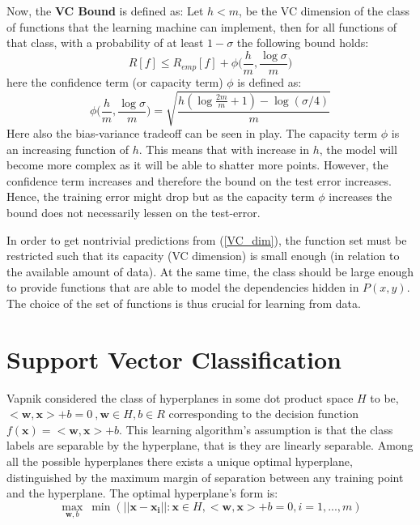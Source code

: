 \documentclass{article}
\begin{document}
Now, the \textbf{VC Bound} is defined as: Let $h < m$, be the VC dimension of the class of functions that the learning machine can implement, then for all functions of that class, with a probability of at least $1-\sigma$ the following bound holds:
\begin{equation}
\label{VC_dim}
R[f] \leq R_{emp}[f] + \phi \Big(\frac{h}{m} , \frac{\log{\sigma}}{m}\Big)
\end{equation}
here the confidence term (or capacity term) $\phi$ is defined as:
\begin{equation}
\phi \Big(\frac{h}{m} , \frac{\log{\sigma}}{m}\Big) = \sqrt{\frac{h(\log{\frac{2m}{m}+1}) - \log(\sigma/4)}{m}}
\end{equation}
Here also the bias-variance tradeoff can be seen in play. The capacity term $\phi$ is an increasing function of $h$. This means that with increase in $h$, the model will become more complex as it will be able to shatter more points. However, the confidence term increases and therefore the bound on the test error increases. Hence, the training error might drop but as the capacity term $\phi$ increases the bound does not necessarily lessen on the test-error. 

In order to get nontrivial predictions from (\ref{VC_dim}), the function set must be restricted such that its capacity (VC dimension) is small enough (in relation to the available amount of data). At the same time, the class should be large enough to provide functions that are able to model the dependencies hidden in $P(x, y)$. The choice of the set of functions is thus crucial for learning from data.

\section{Support Vector Classification}
Vapnik considered the class of hyperplanes in some dot product
space $H$ to be, $<\bm{w},\bm{x}> + b = 0 \ , \bm{w} \in H, b \in R$ corresponding to the decision function $f(\bm{x}) =  <\bm{w},\bm{x}> + b$. This learning algorithm's assumption is that the class labels are separable by the hyperplane, that is they are linearly separable. Among all the possible hyperplanes there exists a unique optimal hyperplane, distinguished by the maximum margin of separation between any training point and the hyperplane. The optimal hyperplane's form is: \\
\begin{equation*}
    \max_{\bm{w},b} \ \min(||\bm{x} - \bm{x_i}|| : \bm{x} \in H, <\bm{w},\bm{x}> +b =0, i=1,...,m)
\end{equation*}
\end{document}
